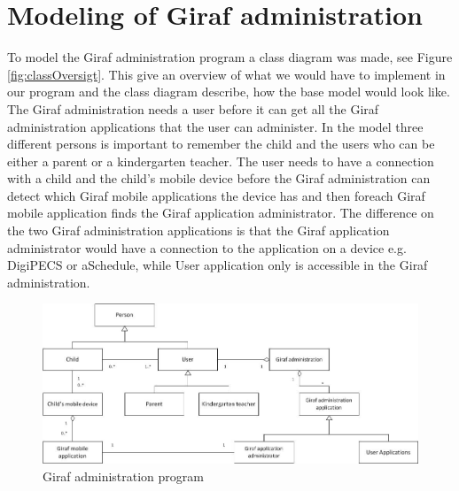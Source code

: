 \section{Modeling of Giraf administration}
To model the Giraf administration program a class diagram was made, see Figure \vref{fig:classOversigt}. This give an overview of what we would have to implement in our program and the class diagram describe, how the base model would look like. The Giraf administration needs a user before it can get all the Giraf administration applications that the user can administer. In the model three different persons is important to remember the child and the users who can be either a parent or a kindergarten teacher. The user needs to have a connection with a child and the child's mobile device before the Giraf administration can detect which Giraf mobile applications the device has and then foreach Giraf mobile application finds the Giraf application administrator. The difference on the two Giraf administration applications is that the Giraf application administrator would have a connection to the application on a device e.g. DigiPECS or aSchedule, while User application only is accessible in the Giraf administration.

\begin{figure}[ht]
	\centering
		\includegraphics[width=1.00\textwidth]{img/classOversigt.jpg}
	\caption{Giraf administration program}
	\label{fig:classOversigt}
\end{figure}
